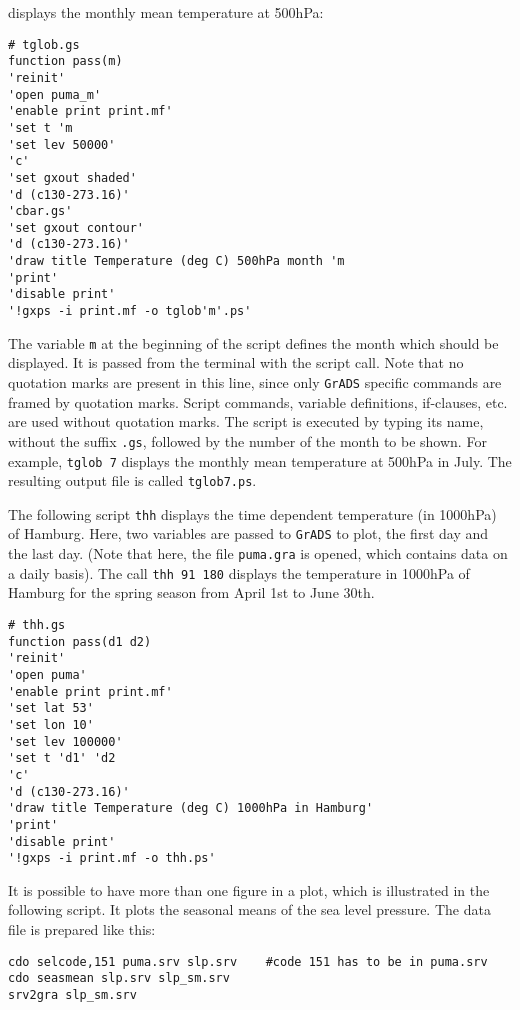 displays the monthly mean temperature at 500hPa:
\begin{verbatim}
# tglob.gs
function pass(m)
'reinit'
'open puma_m'
'enable print print.mf'
'set t 'm
'set lev 50000'
'c'
'set gxout shaded'
'd (c130-273.16)'
'cbar.gs'
'set gxout contour'
'd (c130-273.16)'
'draw title Temperature (deg C) 500hPa month 'm
'print'
'disable print'
'!gxps -i print.mf -o tglob'm'.ps'
\end{verbatim}
The variable \verb/m/ at the beginning of the script defines the month 
which should be displayed. It is passed from the terminal with the 
script call. Note that no quotation marks are present in this line, 
since only \verb/GrADS/ specific commands are framed by quotation marks. 
Script commands, variable definitions, if-clauses, etc. are used without 
quotation marks. The script is executed by typing its name, without 
the suffix \verb/.gs/, followed by the number of the month to be shown. 
For example, \verb/tglob 7/ displays the monthly mean temperature at 500hPa
in July. The resulting output file is called \verb/tglob7.ps/. 
\par
\vspace{3mm}
The following script \verb/thh/ displays the time dependent 
temperature (in 1000hPa) of Hamburg. Here, two variables are passed to \verb/GrADS/ to plot, 
the first day and the last day. (Note that here, the file \verb/puma.gra/ 
is opened, which contains data on a daily basis). The call \verb/thh 91 180/ 
displays the temperature in 1000hPa of Hamburg for the spring season 
from April 1st to June 30th.

\begin{verbatim}
# thh.gs
function pass(d1 d2)
'reinit'
'open puma'
'enable print print.mf'
'set lat 53'
'set lon 10'
'set lev 100000'
'set t 'd1' 'd2
'c'
'd (c130-273.16)'
'draw title Temperature (deg C) 1000hPa in Hamburg'
'print'
'disable print'
'!gxps -i print.mf -o thh.ps'
\end{verbatim}

\vspace{3mm}
It is possible to have more than one figure in a plot, which is 
illustrated in the following script. It plots the seasonal means 
of the sea level pressure. The data file is prepared like this:

\begin{verbatim}
cdo selcode,151 puma.srv slp.srv    #code 151 has to be in puma.srv  
cdo seasmean slp.srv slp_sm.srv
srv2gra slp_sm.srv
\end{verbatim}

